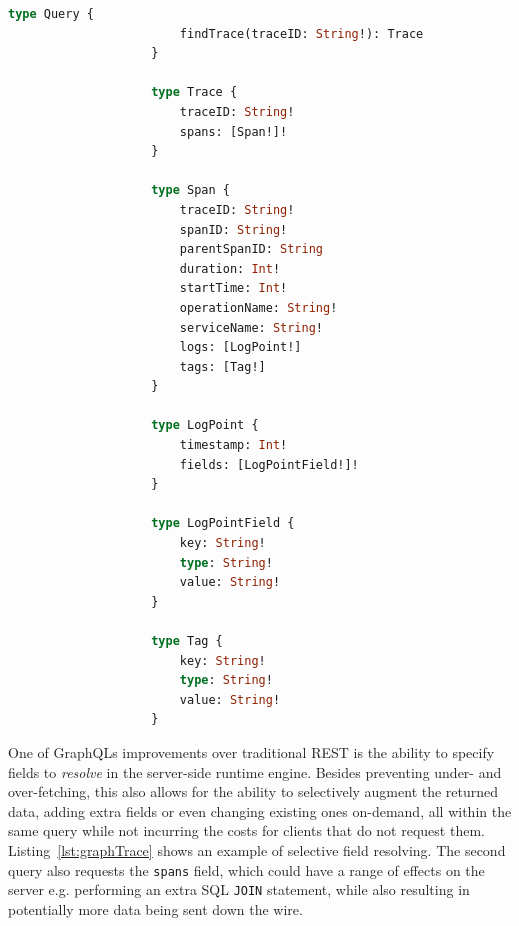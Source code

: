 \documentclass[12pt,pdftex,titlepage]{report}
\begin{document}
                \smallskip
                \begin{lstlisting}[caption={The base GraphQL schema, defining a query and data types for the trace data. Type annotations surrounded brackets denote a list of the type,
                    while a type annotation followed by an exclamation mark indicates a non-optional type.}, language=GraphQL, gobble=20]
                    type Query {
                        findTrace(traceID: String!): Trace
                    }

                    type Trace {
                        traceID: String!
                        spans: [Span!]!
                    }

                    type Span {
                        traceID: String!
                        spanID: String!
                        parentSpanID: String
                        duration: Int!
                        startTime: Int!
                        operationName: String!
                        serviceName: String!
                        logs: [LogPoint!]
                        tags: [Tag!]
                    }

                    type LogPoint {
                        timestamp: Int!
                        fields: [LogPointField!]!
                    }

                    type LogPointField {
                        key: String!
                        type: String!
                        value: String!
                    }

                    type Tag {
                        key: String!
                        type: String!
                        value: String!
                    }
                \end{lstlisting}
                
                One of GraphQLs improvements over traditional REST is the ability to specify fields to \textit{resolve} in the server-side runtime engine. Besides preventing
                under- and over-fetching, this also allows for the ability to selectively augment the returned data, adding extra fields or even changing existing ones on-demand,
                all within the same query while not incurring the costs for clients that do not request them. Listing~\ref{lst:graphTrace} shows an example of selective field
                resolving. The second query also requests the \texttt{spans} field, which could have a range of effects on the server e.g. performing an extra SQL \texttt{JOIN}
                statement, while also resulting in potentially more data being sent down the wire.
\end{document}
